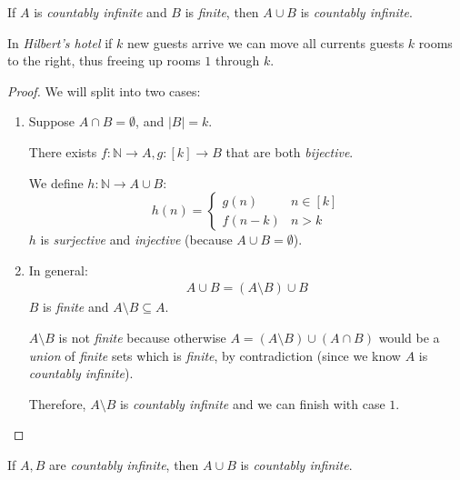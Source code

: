 \documentclass[00_complete]{subfiles}
\begin{document}
\begin{claim}
    If $A$ is \emph{countably infinite} and $B$ is \emph{finite}, then $A\cup
    B$ is \emph{countably infinite}.
\end{claim}
\begin{note}
    In \emph{Hilbert's hotel} if $k$ new guests arrive we can move all currents
    guests $k$ rooms to the right, thus freeing up rooms $1$ through $k$.
\end{note}
\begin{proof}
    We will split into two cases:
    \begin{enumerate}
        \item Suppose $A\cap B = \emptyset$, and $|B|=k$.

        There exists $f:\mathbb{N}\to A, g:[k]\to B$ that are both
        \emph{bijective}.

        We define $h:\mathbb{N}\to A \cup B$:
        $$h(n)=\begin{cases}
            g(n)   & n \in [k] \\
            f(n-k) & n > k
        \end{cases}$$
        $h$ is \emph{surjective} and \emph{injective} (because $A\cup B =
        \emptyset$).
        \item In general:
        \begin{gather*}
            A \cup B = (A \setminus B) \cup B
        \end{gather*}
        $B$ is \emph{finite} and $A \setminus B \subseteq A$.

        $A \setminus B$ is not \emph{finite} because otherwise $A=(A\setminus
        B)\cup(A\cap B)$ would be a \emph{union} of \emph{finite} sets which is
        \emph{finite}, by contradiction (since we know $A$ is \emph{countably
        infinite}).

        Therefore, $A \setminus B$ is \emph{countably infinite} and we can
        finish with case $1$.
    \end{enumerate}
\end{proof}
\begin{claim}
    If $A,B$ are \emph{countably infinite}, then $A \cup B$ is \emph{countably
    infinite}.
\end{claim}
\end{document}

